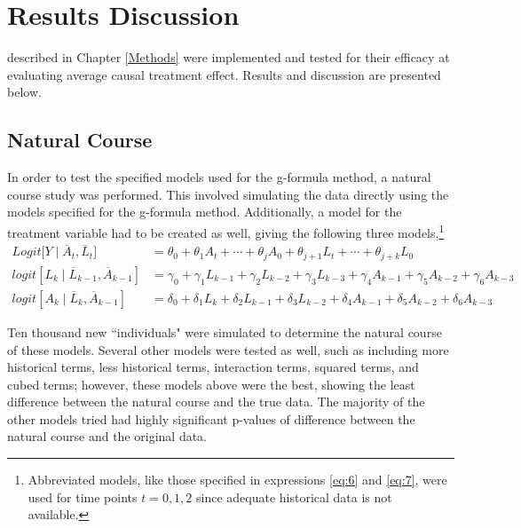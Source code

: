 
\chapter{Results Discussion} \label{Results}

 described in Chapter \ref{Methods} were implemented and tested for their efficacy at evaluating average causal treatment effect.  Results and discussion are presented below.  

\section{Natural Course} \label{nattycourse}
In order to test the specified models used for the g-formula method, a natural course study was performed.  This involved simulating the data directly using the models specified for the g-formula method.  Additionally, a model for the treatment variable had to be created as well, giving the following three models,\footnote{Abbreviated models, like those specified in expressions \ref{eq:6} and \ref{eq:7}, were used for time points $t=0,1,2$ since adequate historical data is not available.} 
\begin{align} 
Logit \big[Y \mid \overline{A}_t, \overline{L}_t \big] &= \theta_{0} + \theta_1 A_{t} + \cdots + \theta_j A_0 + \theta_{j+1} L_t + \cdots + \theta_{j+k} L_0  \label{eq:12} \\ 
logit[L_k \mid \overline{L}_{k-1}, \overline{A}_{k-1}] &= \gamma_0 + \gamma_1 L_{k-1} + \gamma_2 L_{k-2} + \gamma_3 L_{k-3}  + \gamma_4 A_{k-1} + \gamma_5 A_{k-2} + \gamma_6 A_{k-3} \label{eq:13} \\ 
logit[A_k \mid \overline{L}_{k}, \overline{A}_{k-1}] &= \delta_0 + \delta_1 L_{k} + \delta_2 L_{k-1} + \delta_3 L_{k-2}  + \delta_4 A_{k-1} + \delta_5 A_{k-2} + \delta_6 A_{k-3} \label{eq:14}
\end{align} 

Ten thousand new ``individuals" were simulated to determine the natural course of these models.  Several other models were tested as well, such as including more historical terms, less historical terms, interaction terms, squared terms, and cubed terms; however, these models above were the best, showing the least difference between the natural course and the true data.  The majority of the other models tried had highly significant p-values of difference between the natural course and the original data.  

